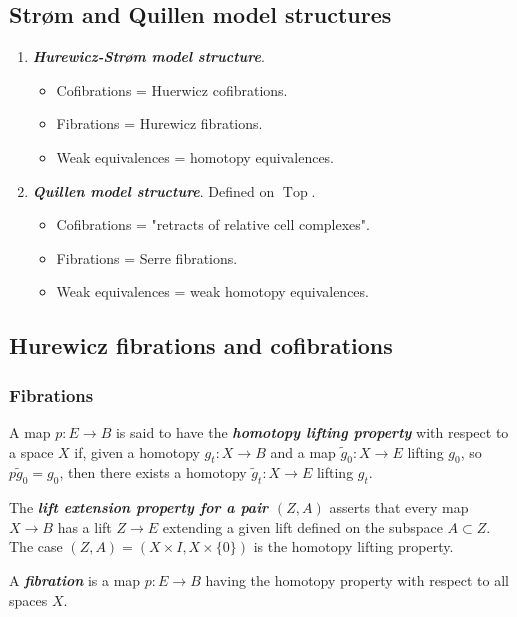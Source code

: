\subsection{Str\o m and Quillen model structures}

\begin{example}\leavevmode
\begin{enumerate}
	\item \textbf{\textit{Hurewicz-Str\o m model structure}}.
	\begin{itemize}
		\item Cofibrations = Huerwicz cofibrations.
		\item Fibrations = Hurewicz fibrations.
		\item Weak equivalences = homotopy equivalences.
	\end{itemize}
	\item \textbf{\textit{Quillen model structure}}. Defined on $\operatorname{Top}$.
	\begin{itemize}
		\item Cofibrations = "retracts of relative cell complexes".
		\item Fibrations = Serre fibrations.
		\item Weak equivalences = weak homotopy equivalences.
	\end{itemize}
\end{enumerate}
\end{example}

\subsection{Hurewicz fibrations and cofibrations}

\subsubsection{Fibrations}

\begin{defn}[Hatcher]
	 A map $p:E\to B$ is said to have the \textbf{\textit{homotopy lifting property}} with respect to a space $X$ if, given a homotopy $g_t:X\to B$ and a map $\tilde{g}_0:X\to E$ lifting $g_0$, so $p\tilde{g}_0=g_0$, then there exists a homotopy $\tilde{g}_t:X\to E$ lifting $g_t$.
	
	The \textbf{\textit{lift extension property for a pair $(Z,A)$}} asserts that every map $X\to B$ has a lift $Z\to E$ extending a given lift defined on the subspace $A\subset Z$. The case $(Z,A)=(X\times I,X\times\{0\})$ is the homotopy lifting property.
	
	A \textbf{\textit{fibration}} is a map $p:E\to B$ having the homotopy property with respect to all spaces $X$.
\end{defn}

